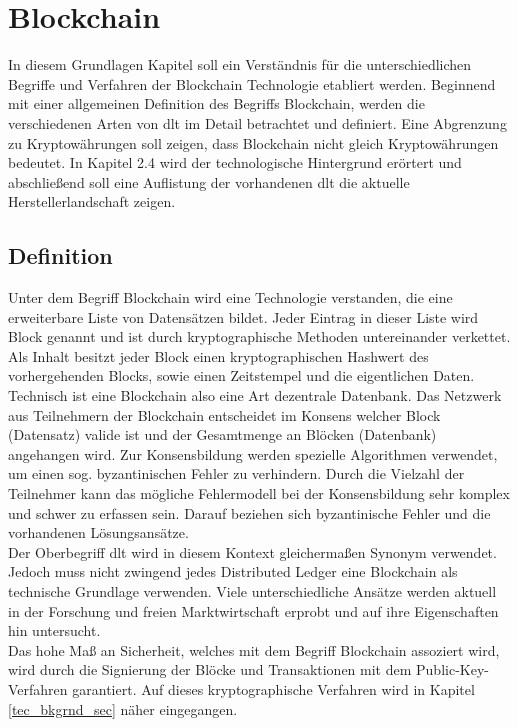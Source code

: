 \section{Blockchain}
In diesem Grundlagen Kapitel soll ein Verständnis für die unterschiedlichen Begriffe und Verfahren der Blockchain Technologie etabliert werden. Beginnend mit einer allgemeinen Definition des Begriffs Blockchain, werden die verschiedenen Arten von \ac{dlt} im Detail betrachtet und definiert. Eine Abgrenzung zu Kryptowährungen soll zeigen, dass Blockchain nicht gleich Kryptowährungen bedeutet. In Kapitel 2.4 wird der technologische Hintergrund erörtert und abschließend soll eine Auflistung der vorhandenen \ac{dlt} die aktuelle Herstellerlandschaft zeigen.

\subsection{Definition}
Unter dem Begriff Blockchain wird eine Technologie verstanden, die eine erweiterbare Liste von Datensätzen bildet. Jeder Eintrag in dieser Liste wird Block genannt und ist durch kryptographische Methoden untereinander verkettet. Als Inhalt besitzt jeder Block einen kryptographischen Hashwert des vorhergehenden Blocks, sowie einen Zeitstempel und die eigentlichen Daten.\cite[Vgl.]{narayanan2016bitcoin}\\
Technisch ist eine Blockchain also eine Art dezentrale Datenbank. Das Netzwerk aus Teilnehmern der Blockchain entscheidet im Konsens welcher Block (Datensatz) valide ist und der Gesamtmenge an Blöcken (Datenbank) angehangen wird. Zur Konsensbildung werden spezielle Algorithmen verwendet, um einen sog. byzantinischen Fehler zu verhindern. Durch die Vielzahl der Teilnehmer kann das mögliche Fehlermodell bei der Konsensbildung sehr komplex und schwer zu erfassen sein. Darauf beziehen sich byzantinische Fehler und die vorhandenen Lösungsansätze.\\
Der Oberbegriff \acf{dlt} wird in diesem Kontext gleichermaßen Synonym verwendet. Jedoch muss nicht zwingend jedes \glqq Distributed Ledger\grqq{} eine Blockchain als technische Grundlage verwenden. Viele unterschiedliche Ansätze werden aktuell in der Forschung und freien Marktwirtschaft erprobt und auf ihre Eigenschaften hin untersucht.\\
Das hohe Maß an Sicherheit, welches mit dem Begriff Blockchain assoziert wird, wird durch die Signierung der Blöcke und Transaktionen mit dem Public-Key-Verfahren garantiert. Auf dieses kryptographische Verfahren wird in Kapitel \ref{tec_bkgrnd_sec} näher eingegangen.\cite[Vgl.]{Mitschele2018}

